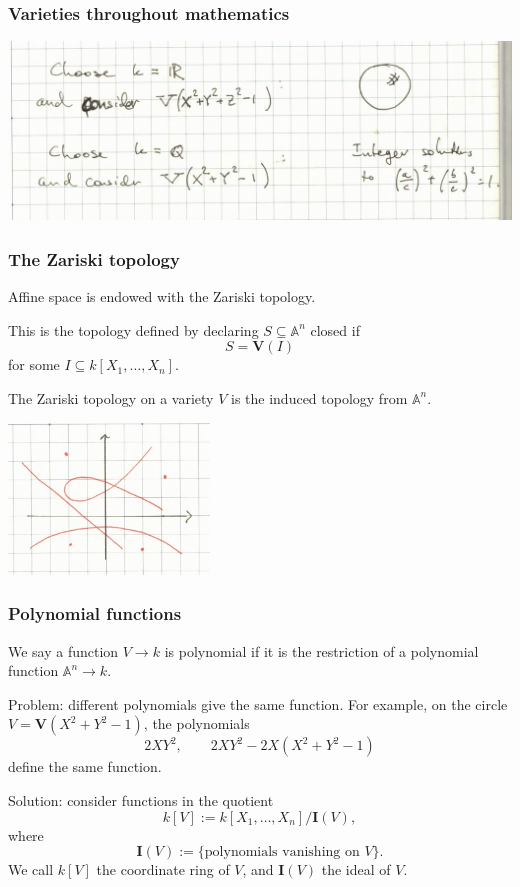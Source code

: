 \documentclass{beamer}
\theoremstyle{definition}
\theoremstyle{definition}
\begin{document}
\begin{frame}
\frametitle{Varieties throughout mathematics}
\includegraphics[width=\textwidth]{sphere_and_pythag_triples}
\end{frame}

\begin{frame}
\frametitle{The Zariski topology}
Affine space is endowed with the \alert{Zariski topology}.

This is the topology defined by declaring $S \subseteq \mathbb{A}^n$ closed if
$$S = \mathbf{V}(I)$$
for some $I \subseteq k[X_1, \ldots, X_n]$.

The Zariski topology on a variety $V$ is the induced topology from $\mathbb{A}^n$.

\centerline{\includegraphics[width=0.4\textwidth]{zariski_open}}
\end{frame}

\begin{frame}
\frametitle{Polynomial functions}
We say a function $V \to k$ is \alert{polynomial} if it is the restriction of a polynomial function $\mathbb{A}^n \to k$.

Problem: different polynomials give the same function.
For example, on the circle $V = \mathbf{V}(X^2+Y^2-1)$, the polynomials
$$2 X Y^2, \qquad 2 X Y^2 - 2X (X^2+Y^2-1)$$
define the same function.

Solution: consider functions in the quotient
$$k[V] := k[X_1, \ldots, X_n] / \mathbf{I}(V),$$
where
$$\mathbf{I}(V) := \{\text{polynomials vanishing on $V$}\}.$$
We call $k[V]$ the \alert{coordinate ring} of $V$, and $\mathbf{I}(V)$ the \alert{ideal} of $V$.

\end{frame}
\end{document}
